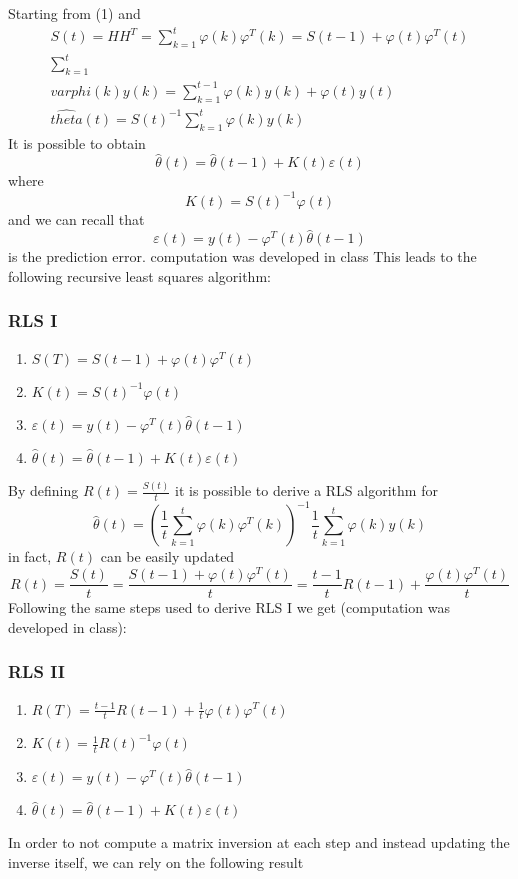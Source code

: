 \documentclass{book}
\begin{document}
Starting from (1) and 
\begin{gather*}
    S(t)=HH^T=\sum_{k=1}^t\varphi(k)\varphi^T(k)=S(t-1)+\varphi(t)\varphi^T(t)\\
    \sum_{k=1}^t\\varphi(k)y(k)=\sum_{k=1}^{t-1}\varphi(k)y(k)+\varphi(t)y(t)\\
    \hat{theta}(t)=S(t)^{-1}\sum_{k=1}^t\varphi(k)y(k)
\end{gather*}
It is possible to obtain
\[
    \hat{\theta}(t)=\hat{\theta}(t-1)+K(t)\varepsilon(t)
\]
where
\[
    K(t)=S(t)^{-1}\varphi(t)
\]
and we can recall that
\[
    \varepsilon(t) = y(t)-\varphi^T(t)\hat{\theta}(t-1)
\]
is the prediction error.
computation was developed in class
This leads to the following recursive least squares algorithm:
\subsubsection{RLS I}
\begin{enumerate}
    \item $S(T) = S(t-1) + \varphi(t)\varphi^T(t)$
    \item $K(t) = S(t)^{-1}\varphi(t)$
    \item $\varepsilon(t)=y(t)-\varphi^T(t)\hat{\theta}(t-1)$
    \item $\hat{\theta}(t)=\hat{\theta}(t-1)+K(t)\varepsilon(t)$
\end{enumerate}
By defining \(R(t) = \frac{S(t)}{t}\) it is possible to derive a RLS algorithm for
\[
    \hat{\theta}(t) = \left(\frac{1}{t}\sum_{k=1}^t \varphi(k)\varphi^T(k)\right)^{-1}\frac{1}{t}\sum_{k=1}^t\varphi(k)y(k)
\]
in fact, $R(t)$ can be easily updated
\[
    R(t)=\frac{S(t)}{t}=\frac{S(t-1)+\varphi(t)\varphi^T(t)}{t}=\frac{t-1}{t}R(t-1)+\frac{\varphi(t)\varphi^T(t)}{t}
\]
Following the same steps used to derive RLS I we get (computation was developed in class):
\subsubsection{RLS II}
\begin{enumerate}
    \item $R(T) = \frac{t-1}{t}R(t-1) + \frac{1}{t}\varphi(t)\varphi^T(t)$
    \item $K(t) = \frac{1}{t}R(t)^{-1}\varphi(t)$
    \item $\varepsilon(t)=y(t)-\varphi^T(t)\hat{\theta}(t-1)$
    \item $\hat{\theta}(t)=\hat{\theta}(t-1)+K(t)\varepsilon(t)$
\end{enumerate}
In order to not compute a matrix inversion at each step and instead updating the inverse itself, we can rely on the following result
\end{document}
